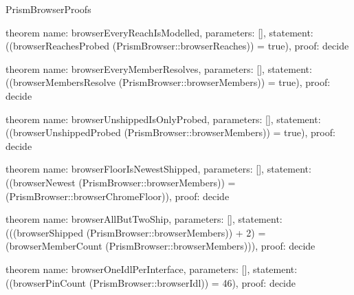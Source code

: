 \begin{lexlean}{PrismBrowserProofs}
\begin{semanticmodule}
theorem{
  name: browserEveryReachIsModelled,
  parameters: [],
  statement: ((browserReachesProbed (PrismBrowser::browserReaches)) = true),
  proof: decide{}
}

theorem{
  name: browserEveryMemberResolves,
  parameters: [],
  statement: ((browserMembersResolve (PrismBrowser::browserMembers)) = true),
  proof: decide{}
}

theorem{
  name: browserUnshippedIsOnlyProbed,
  parameters: [],
  statement: ((browserUnshippedProbed (PrismBrowser::browserMembers)) = true),
  proof: decide{}
}

theorem{
  name: browserFloorIsNewestShipped,
  parameters: [],
  statement: ((browserNewest (PrismBrowser::browserMembers)) = (PrismBrowser::browserChromeFloor)),
  proof: decide{}
}

theorem{
  name: browserAllButTwoShip,
  parameters: [],
  statement: (((browserShipped (PrismBrowser::browserMembers)) + 2) = (browserMemberCount (PrismBrowser::browserMembers))),
  proof: decide{}
}

theorem{
  name: browserOneIdlPerInterface,
  parameters: [],
  statement: ((browserPinCount (PrismBrowser::browserIdl)) = 46),
  proof: decide{}
}
\end{semanticmodule}
\end{lexlean}
